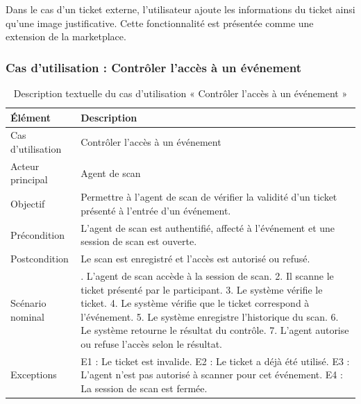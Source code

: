 Dans le cas d’un ticket externe, l’utilisateur ajoute les informations du ticket ainsi qu’une image justificative. Cette fonctionnalité est présentée comme une extension de la marketplace.


\subsubsection{Cas d’utilisation : Contrôler l’accès à un événement}


\begin{table}[H]
\centering
\caption{Description textuelle du cas d’utilisation « Contrôler l’accès à un événement »}
\label{tableau:6-4}
\renewcommand{\arraystretch}{1.2}
\begin{tabularx}{\textwidth}{|>{\raggedright\arraybackslash}X|>{\raggedright\arraybackslash}X|}
\hline
\rowcolor[HTML]{ECF4FF}
\textbf{Élément} & \textbf{Description} \\
\hline
Cas d’utilisation & Contrôler l’accès à un événement \\
\hline
Acteur principal & Agent de scan \\
\hline
Objectif & Permettre à l’agent de scan de vérifier la validité d’un ticket présenté à l’entrée d’un événement. \\
\hline
Précondition & L’agent de scan est authentifié, affecté à l’événement et une session de scan est ouverte. \\
\hline
Postcondition & Le scan est enregistré et l’accès est autorisé ou refusé. \\
\hline
Scénario nominal & 1. L’agent de scan accède à la session de scan.\newline{} 2. Il scanne le ticket présenté par le participant.\newline{} 3. Le système vérifie le ticket.\newline{} 4. Le système vérifie que le ticket correspond à l’événement.\newline{} 5. Le système enregistre l’historique du scan.\newline{} 6. Le système retourne le résultat du contrôle.\newline{} 7. L’agent autorise ou refuse l’accès selon le résultat. \\
\hline
Exceptions & E1 : Le ticket est invalide.\newline{} E2 : Le ticket a déjà été utilisé.\newline{} E3 : L’agent n’est pas autorisé à scanner pour cet événement.\newline{} E4 : La session de scan est fermée. \\
\hline
\end{tabularx}
\end{table}


